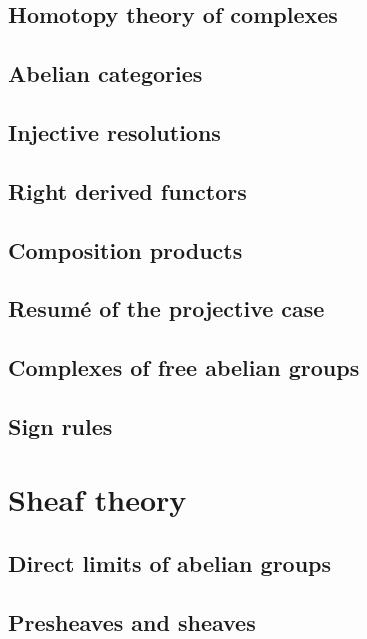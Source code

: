 \documentclass[5pt]{article}
\theoremstyle{definition}
\theoremstyle{remark}
\begin{document}
	\subsection{Homotopy theory of complexes}
	
	\subsection{Abelian categories}
	
	\subsection{Injective resolutions}
	
	\subsection{Right derived functors}
	
	\subsection{Composition products}
	
	\subsection{Resumé of the projective case}
	
	\subsection{Complexes of free abelian groups}
	
	\subsection{Sign rules}
	
	\newpage
	
	\section{Sheaf theory}
	
	\setcounter{subsection}{-1}
	
	\subsection{Direct limits of abelian groups}
	
	\subsection{Presheaves and sheaves}
	
\end{document}
